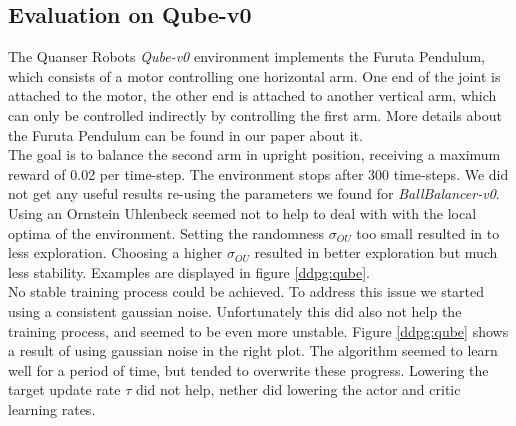 \subsection{Evaluation on Qube-v0}
The Quanser Robots \textit{Qube-v0} environment implements the Furuta Pendulum, which consists of a motor controlling one horizontal arm. One end of the joint is attached to the motor, the other end is attached to another vertical arm, which can only be controlled indirectly by controlling the first arm. More details about the Furuta Pendulum can be found in our paper about it.\\
The goal is to balance the second arm in upright position, receiving a maximum reward of 0.02 per time-step. The environment stops after 300 time-steps.
We did not get any useful results re-using the parameters we found for \textit{BallBalancer-v0}. Using an Ornstein Uhlenbeck seemed not to help to deal with with the local optima of the environment. Setting the randomness $\sigma_{OU}$ too small resulted in to less exploration. Choosing a higher $\sigma_{OU}$ resulted in better exploration but much less stability. Examples are displayed in figure \ref{ddpg:qube}.\\
No stable training process could be achieved. To address this issue we started using a consistent gaussian noise. Unfortunately this did also not help the training process, and seemed to be even more unstable. Figure \ref{ddpg:qube} shows a result of using gaussian noise in the right plot. The algorithm seemed to learn well for a period of time, but tended to overwrite these progress. Lowering the target update rate $\tau$ did not help, nether did lowering the actor and critic learning rates.
